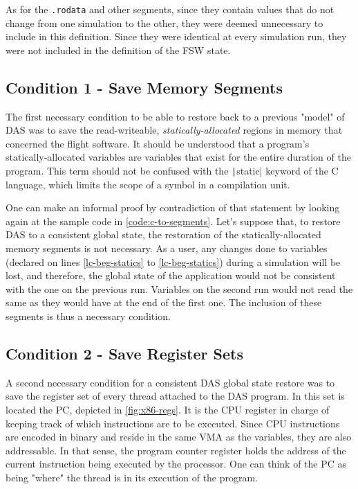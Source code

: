{As for the \texttt{.rodata} and other segments, since they contain values that do not change from one simulation to the other, they were deemed unnecessary to include in this definition. Since they were identical at every simulation run, they were not included in the definition of the FSW state.

\subsection*{Condition 1 - Save Memory Segments}
The first necessary condition to be able to restore back to a previous "model" of DAS was to save the read-writeable, \textit{statically-allocated} regions in memory that concerned the flight software. It should be understood that a program's statically-allocated variables are variables that exist for the entire duration of the program. This term should not be confused with the \texttt|static| keyword of the C language, which limits the scope of a symbol in a compilation unit.

One can make an informal proof by contradiction of that statement by looking again at the sample code in \autoref{code:c-to-segments}. Let's suppose that, to restore DAS to a consistent global state, the restoration of the statically-allocated memory segments is not necessary. As a user, any changes done to variables (declared on lines \ref{lc-beg-statics} to \ref{lc-beg-statics}) during a simulation will be lost, and therefore, the global state of the application would not be consistent with the one on the previous run. Variables on the second run would not read the same as they would have at the end of the first one. The inclusion of these segments is thus a necessary condition.

\subsection*{Condition 2 - Save Register Sets}
A second necessary condition for a consistent DAS global state restore was to save the register set of every thread attached to the DAS program. In this set is located the \gls{PC}, depicted in \autoref{fig:x86-regs}. It is the CPU register in charge of keeping track of which instructions are to be executed. Since CPU instructions are encoded in binary and reside in the same \gls{VMA} as the variables, they are also addressable. In that sense, the program counter register holds the address of the current instruction being executed by the processor. One can think of the PC as being "where" the thread is in its execution of the program.

}
